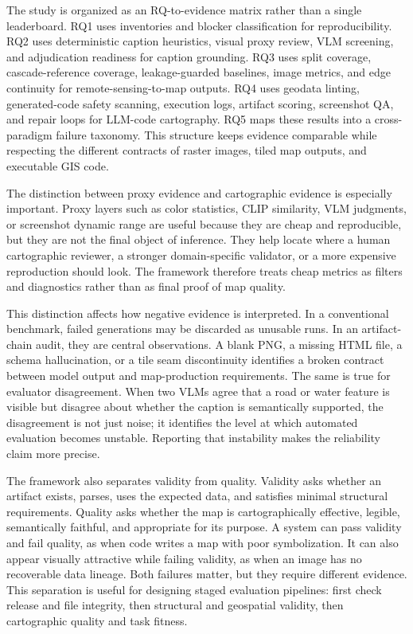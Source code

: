 \documentclass[]{interact}
\begin{document}
The study is organized as an RQ-to-evidence matrix rather than a single leaderboard. RQ1 uses inventories and blocker classification for reproducibility. RQ2 uses deterministic caption heuristics, visual proxy review, VLM screening, and adjudication readiness for caption grounding. RQ3 uses split coverage, cascade-reference coverage, leakage-guarded baselines, image metrics, and edge continuity for remote-sensing-to-map outputs. RQ4 uses geodata linting, generated-code safety scanning, execution logs, artifact scoring, screenshot QA, and repair loops for LLM-code cartography. RQ5 maps these results into a cross-paradigm failure taxonomy. This structure keeps evidence comparable while respecting the different contracts of raster images, tiled map outputs, and executable GIS code.

The distinction between proxy evidence and cartographic evidence is especially important. Proxy layers such as color statistics, CLIP similarity, VLM judgments, or screenshot dynamic range are useful because they are cheap and reproducible, but they are not the final object of inference. They help locate where a human cartographic reviewer, a stronger domain-specific validator, or a more expensive reproduction should look. The framework therefore treats cheap metrics as filters and diagnostics rather than as final proof of map quality.

This distinction affects how negative evidence is interpreted. In a conventional benchmark, failed generations may be discarded as unusable runs. In an artifact-chain audit, they are central observations. A blank PNG, a missing HTML file, a schema hallucination, or a tile seam discontinuity identifies a broken contract between model output and map-production requirements. The same is true for evaluator disagreement. When two VLMs agree that a road or water feature is visible but disagree about whether the caption is semantically supported, the disagreement is not just noise; it identifies the level at which automated evaluation becomes unstable. Reporting that instability makes the reliability claim more precise.

The framework also separates validity from quality. Validity asks whether an artifact exists, parses, uses the expected data, and satisfies minimal structural requirements. Quality asks whether the map is cartographically effective, legible, semantically faithful, and appropriate for its purpose. A system can pass validity and fail quality, as when code writes a map with poor symbolization. It can also appear visually attractive while failing validity, as when an image has no recoverable data lineage. Both failures matter, but they require different evidence. This separation is useful for designing staged evaluation pipelines: first check release and file integrity, then structural and geospatial validity, then cartographic quality and task fitness.
\end{document}
